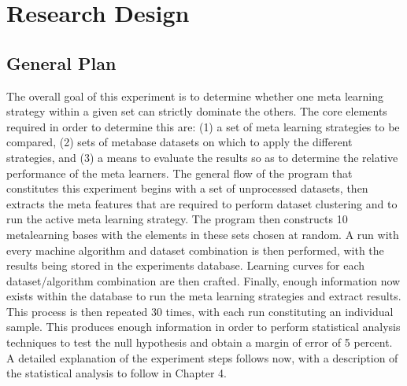 \chapter{Research Design}
\label{Chapter3}
\section{General Plan}
The overall goal of this experiment is to determine whether one meta learning
strategy within a given set can strictly dominate the others. The core elements
required in order to determine this are: (1) a set of meta learning strategies to be
compared, (2) sets of metabase datasets on which to apply the different strategies,
and (3) a means to evaluate the results so as to determine the relative performance
of the meta learners. The general flow of the program that constitutes this
experiment begins with a set of unprocessed datasets, then extracts the
meta features that are required to perform dataset clustering and to
run the active meta learning strategy. The program then constructs 10
metalearning bases with the elements in these sets chosen at random. A run with
every machine algorithm and dataset combination is then performed, with the
results being stored in the experiments database. Learning curves for each
dataset/algorithm combination are then crafted. Finally, enough information now
exists within the database to run the meta learning strategies
and extract results. This process is then repeated 30 times, with each run
constituting an individual sample. This produces enough information in order
to perform statistical analysis techniques to test the null hypothesis and
obtain a margin of error of 5 percent. A detailed explanation of the experiment
steps follows now, with a description of the statistical analysis to follow in
Chapter 4.

